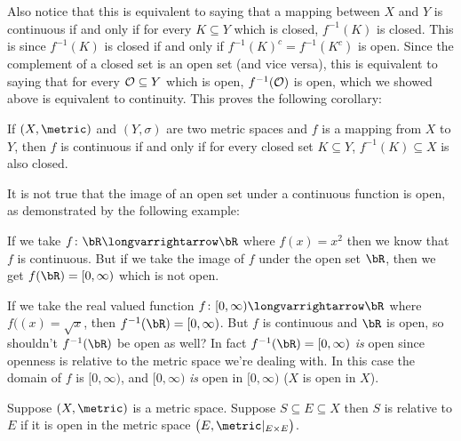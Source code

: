 \documentclass[10pt]{article}
\def\openset{{\cal O}}
\begin{document}
Also notice that this is equivalent to saying that a mapping between $X$ and $Y$ is continuous if and only if for every $K\subseteq Y$ which is closed, $f^{-1}(K)$ is closed.
This is since $f^{-1}(K)$ is closed if and only if $f^{-1}(K)^c=f^{-1}(K^c)$ is open.
Since the complement of a closed set is an open set (and vice versa), this is equivalent to saying that for every $\openset\subseteq Y$ which is open, $f^{-1}(\openset)$ is open, which we showed above is
equivalent to continuity.
This proves the following corollary:

\begin{coro*}

    If $(X,\metric)$ and $(Y,\sigma)$ are two metric spaces and $f$ is a mapping from $X$ to $Y$, then $f$ is continuous if and only if for every closed set $K\subseteq Y$, $f^{-1}(K)\subseteq X$
    is also closed.

\end{coro*}

It is not true that the image of an open set under a continuous function is open, as demonstrated by the following example:

\begin{exam}

    If we take $f\colon\bR\longvarrightarrow\bR$ where $f(x)=x^2$ then we know that $f$ is continuous.
    But if we take the image of $f$ under the open set $\bR$, then we get $f(\bR)=[0,\infty)$ which is not open.

\end{exam}

\begin{exam}

    If we take the real valued function $f\colon[0,\infty)\longvarrightarrow\bR$ where $f((x)=\sqrt x$, then $f^{-1}(\bR)=[0,\infty)$.
    But $f$ is continuous and $\bR$ is open, so shouldn't $f^{-1}(\bR)$ be open as well?
    In fact $f^{-1}(\bR)=[0,\infty)$ \emph{is} open since openness is relative to the metric space we're dealing with.
    In this case the domain of $f$ is $[0,\infty)$, and $[0,\infty)$ \emph{is} open in $[0,\infty)$ ($X$ is open in $X$).

\end{exam}

\begin{defn*}

    Suppose $(X,\metric)$ is a metric space.
    Suppose $S\subseteq E\subseteq X$ then $S$ is  relative to $E$ if it is open in the metric space $\bigl(E,\metric\vert_{E\times E}\bigr)$.

\end{defn*}
\end{document}

